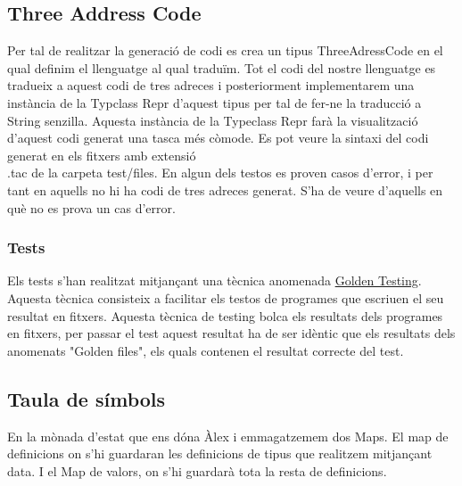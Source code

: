 \documentclass{article}
\begin{document}
\subsection{Three Address Code}
Per tal de realitzar la generació de codi es crea un tipus ThreeAdressCode en el qual definim el llenguatge al qual traduïm. Tot el codi del nostre llenguatge es tradueix a aquest codi de tres adreces i posteriorment implementarem una instància de la Typclass Repr d'aquest tipus per tal de fer-ne la traducció a String senzilla. Aquesta instància de la Typeclass Repr farà la visualització d'aquest codi generat una tasca més còmode.
Es pot veure la sintaxi del codi generat en els fitxers amb extensió\\
.tac de la carpeta test/files. En algun dels testos es proven casos d'error, i per tant en aquells no hi ha codi de tres adreces generat. S'ha de veure d'aquells en què no es prova un cas d'error.
\subsubsection{Tests}
Els tests s'han realitzat mitjançant una tècnica anomenada \href{https://hackage.haskell.org/package/tasty-golden}{Golden Testing}. Aquesta tècnica consisteix a facilitar els testos de programes que escriuen el seu resultat en fitxers. Aquesta tècnica de testing bolca els resultats dels programes en fitxers, per passar el test aquest resultat ha de ser idèntic que els resultats dels anomenats "Golden files", els quals contenen el resultat correcte del test.
\subsection{Taula de símbols}
En la mònada d'estat que ens dóna Àlex i emmagatzemem dos Maps. El map
de definicions on s'hi guardaran les definicions de tipus que realitzem
mitjançant data. I el Map de valors, on s'hi guardarà tota la resta de
definicions.
\end{document}
